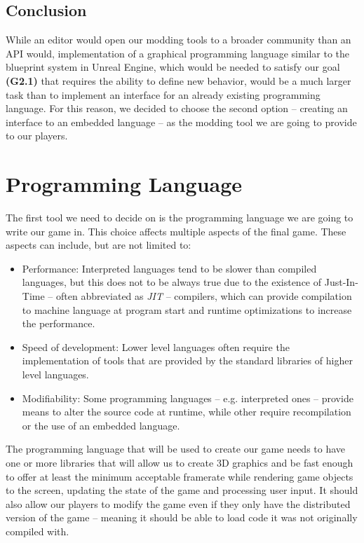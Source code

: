 \subsection{Conclusion}

While an editor would open our modding tools to a broader community than an API would, implementation of a graphical programming
language similar to the blueprint system in Unreal Engine, which would be needed to satisfy our goal \textbf{(G2.1)} that requires
the ability to define new behavior, would be a much larger task than to implement an interface for an already
existing programming language. For this reason, we decided to choose the second option -- creating an interface to an embedded
language -- as the modding tool we are going to provide to our players.

\section{Programming Language}

The first tool we need to decide on is the programming language we are going to write our game in.
This choice affects multiple aspects of the final game. These aspects can include, but are not limited to:

\begin{itemize}
    \item Performance: Interpreted languages tend to be slower than compiled languages, but this
        does not to be always true due to the existence of Just-In-Time -- often abbreviated as \emph{JIT} -- compilers, 
        which can provide compilation
        to machine language at program start and runtime optimizations to increase the performance.
    \item Speed of development: Lower level languages often require the implementation of tools that
        are provided by the standard libraries of higher level languages.
    \item Modifiability: Some programming languages -- e.g. interpreted ones -- provide means to
        alter the source code at runtime, while other require recompilation or the use of an embedded language.
\end{itemize}

The programming language that will be used to create our game needs to have one or more libraries that will allow us
to create 3D graphics and be fast enough to offer at least the minimum acceptable framerate while rendering game objects
to the screen, updating the state of the game and processing user input. It should also allow our players to modify the game
even if they only have the distributed version of the game -- meaning it should be able to load code it was not originally compiled
with.

